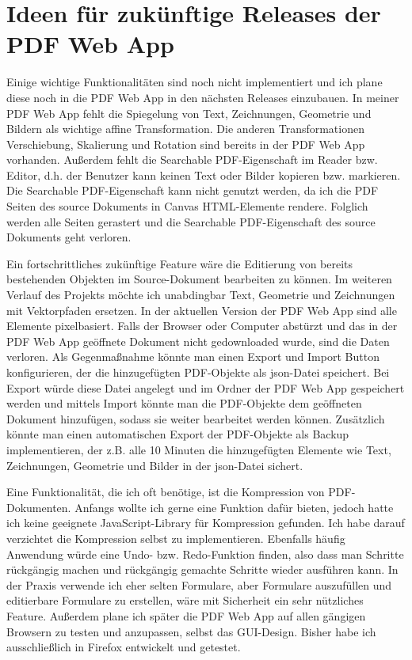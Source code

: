 \section{Ideen für zukünftige Releases der PDF Web App}
Einige wichtige Funktionalitäten sind noch nicht implementiert und ich plane diese noch in die PDF Web App in den nächsten Releases einzubauen. In meiner PDF Web App fehlt die Spiegelung von Text, Zeichnungen, Geometrie und Bildern als wichtige affine Transformation. Die anderen Transformationen Verschiebung, Skalierung und Rotation sind bereits in der PDF Web App vorhanden. Außerdem fehlt die Searchable PDF-Eigenschaft im Reader bzw. Editor, d.h. der Benutzer kann keinen Text oder Bilder kopieren bzw. markieren. Die Searchable PDF-Eigenschaft kann nicht genutzt werden, da ich die PDF Seiten des source Dokuments in Canvas HTML-Elemente rendere. Folglich werden alle Seiten gerastert und die Searchable PDF-Eigenschaft des source Dokuments geht verloren. 
\par
Ein fortschrittliches zukünftige Feature wäre die Editierung von bereits bestehenden Objekten im Source-Dokument bearbeiten zu können. Im weiteren Verlauf des Projekts möchte ich unabdingbar Text, Geometrie und Zeichnungen mit Vektorpfaden ersetzen. In der aktuellen Version der PDF Web App sind alle Elemente pixelbasiert. Falls der Browser oder Computer abstürzt und das in der PDF Web App geöffnete Dokument nicht gedownloaded wurde, sind die Daten verloren. Als Gegenmaßnahme könnte man einen Export und Import Button konfigurieren, der die hinzugefügten PDF-Objekte als \gls{json}-Datei speichert. Bei Export würde diese Datei angelegt und im Ordner der PDF Web App gespeichert werden und mittels Import könnte man die PDF-Objekte dem geöffneten Dokument hinzufügen, sodass sie weiter bearbeitet werden können. Zusätzlich könnte man einen automatischen Export der PDF-Objekte als Backup implementieren, der z.B. alle 10 Minuten die hinzugefügten Elemente wie Text, Zeichnungen, Geometrie und Bilder in der \gls{json}-Datei sichert.
\par
Eine Funktionalität, die ich oft benötige, ist die Kompression von PDF-Dokumenten. Anfangs wollte ich gerne eine Funktion dafür bieten, jedoch hatte ich keine geeignete JavaScript-Library für Kompression gefunden. Ich habe darauf verzichtet die Kompression selbst zu implementieren. Ebenfalls häufig Anwendung würde eine Undo- bzw. Redo-Funktion finden, also dass man Schritte rückgängig machen und rückgängig gemachte Schritte wieder ausführen kann. In der Praxis verwende ich eher selten Formulare, aber Formulare auszufüllen und editierbare Formulare zu erstellen, wäre mit Sicherheit ein sehr nützliches Feature. Außerdem plane ich später die PDF Web App auf allen gängigen Browsern zu testen und anzupassen, selbst das GUI-Design. Bisher habe ich ausschließlich in Firefox entwickelt und getestet.